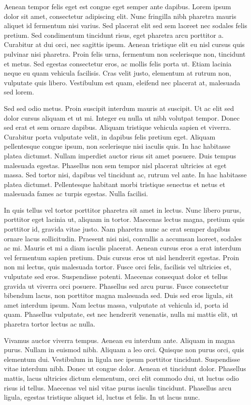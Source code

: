 Aenean tempor felis eget est congue eget semper ante dapibus.
Lorem ipsum dolor sit amet, consectetur adipiscing elit.
Nunc fringilla nibh pharetra mauris aliquet id fermentum nisi varius.
Sed placerat elit sed sem laoreet nec sodales felis pretium.
Sed condimentum tincidunt risus, eget pharetra arcu porttitor a.
Curabitur at dui orci, nec sagittis ipsum.
Aenean tristique elit eu nisl cursus quis pulvinar nisi pharetra.
Proin felis urna, fermentum non scelerisque non, tincidunt et metus.
Sed egestas consectetur eros, ac mollis felis porta ut.
Etiam lacinia neque eu quam vehicula facilisis.
Cras velit justo, elementum at rutrum non, vulputate quis libero.
Vestibulum est quam, eleifend nec placerat at, malesuada sed lorem.

Sed sed odio metus.
Proin suscipit interdum mauris at suscipit.
Ut ac elit sed dolor cursus aliquam et ut mi.
Integer eu nulla ut nibh volutpat tempor.
Donec sed erat et sem ornare dapibus.
Aliquam tristique vehicula sapien et viverra.
Curabitur porta vulputate velit, in dapibus felis pretium eget.
Aliquam pellentesque congue ipsum, non scelerisque nisi iaculis quis.
In hac habitasse platea dictumst.
Nullam imperdiet auctor risus sit amet posuere.
Duis tempus malesuada egestas.
Phasellus non sem tempor nisl placerat ultricies at eget massa.
Sed tortor nisi, dapibus vel tincidunt ac, rutrum vel ante.
In hac habitasse platea dictumst.
Pellentesque habitant morbi tristique senectus et netus et malesuada fames ac turpis egestas.
Nulla facilisi.

In quis tellus vel tortor porttitor pharetra sit amet in lectus.
Nunc libero purus, porttitor eget lacinia ut, aliquam in tortor.
Maecenas lectus magna, pretium quis porttitor id, gravida vitae justo.
Nam pharetra nunc ac erat semper dapibus ornare lacus sollicitudin.
Praesent nisi nisi, convallis a accumsan laoreet, sodales ac mi.
Mauris et mi a diam iaculis placerat.
Aenean cursus eros a erat interdum vel fermentum sapien pretium.
Duis cursus eros ut nisl hendrerit egestas.
Proin non mi lectus, quis malesuada tortor.
Fusce orci felis, facilisis vel ultricies et, vulputate sed eros.
Suspendisse potenti.
Maecenas consequat dolor et tellus gravida ut viverra orci posuere.
Phasellus sed arcu purus.
Fusce consectetur bibendum lacus, non porttitor magna malesuada sed.
Duis sed eros ligula, sit amet interdum ipsum.
Nam lectus massa, vulputate at vehicula id, porta id quam.
Phasellus vulputate, est nec hendrerit venenatis, nulla mi mattis elit, ut pharetra tortor lectus ac nulla.

Vivamus auctor viverra tempus.
Aenean eu interdum ante.
Aliquam in magna purus.
Nullam in euismod nibh.
Aliquam a leo orci.
Quisque non purus orci, quis elementum dui.
Vestibulum in ligula nec ipsum porttitor tincidunt.
Suspendisse vitae interdum nibh.
Donec ut congue dolor.
Aenean et tincidunt dolor.
Phasellus mattis, lacus ultricies dictum elementum, orci elit commodo dui, ut luctus odio risus id tellus.
Maecenas vel nisl vitae purus iaculis tincidunt.
Phasellus arcu ligula, egestas tristique aliquet id, luctus et felis.
In ut lacus nunc.

